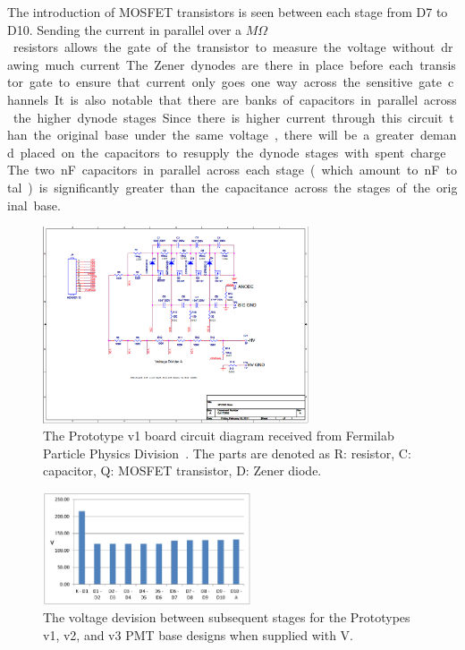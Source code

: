 The introduction of MOSFET transistors is seen between each stage from D7 to D10. Sending the current in parallel over a \unit[1]{$M\Omega$} resistors allows the gate of the transistor to measure the voltage without drawing much current. The Zener dynodes are there in place before each transistor gate to ensure that current only goes one way across the sensitive gate channels.

It is also notable that there are banks of capacitors in parallel across the higher dynode stages. Since there is higher current through this circuit than the original base under the same voltage, there will be a greater demand placed on the capacitors to resupply the dynode stages with spent charge. The two \unit[10]{nF} capacitors in parallel across each stage (which amount to \unit[20]{nF} total) is significantly greater than the capacitance across the stages of the original base.

\begin{figure}
	\centerline{
		\mbox{\includegraphics[width=0.7\textwidth]{figures/pmtupgrade/newbase.png}}
	}
	\caption{The Prototype v1 board circuit diagram received from Fermilab Particle Physics Division~\cite{pc:sten}. The parts are denoted as R: resistor, C: capacitor, Q: MOSFET transistor, D: Zener diode.}
	\label{fig:v1-board}
\end{figure}

\begin{figure}
	\centerline{
		\mbox{\includegraphics[width=0.55\textwidth]{figures/pmtupgrade/v123-volt.jpg}}
	}
	\caption{The voltage devision between subsequent stages for the Prototypes v1, v2, and v3 PMT base designs  when supplied with \unit[-1500]{V}.}
	\label{fig:v123-volt}
\end{figure}


